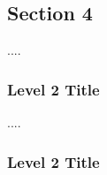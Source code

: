 \subsection{Section 4}

\begin{flushleft}
    ....
\end{flushleft}

\subsubsection{Level 2 Title}

\begin{flushleft}
    ....
\end{flushleft}

\subsubsection{Level 2 Title}